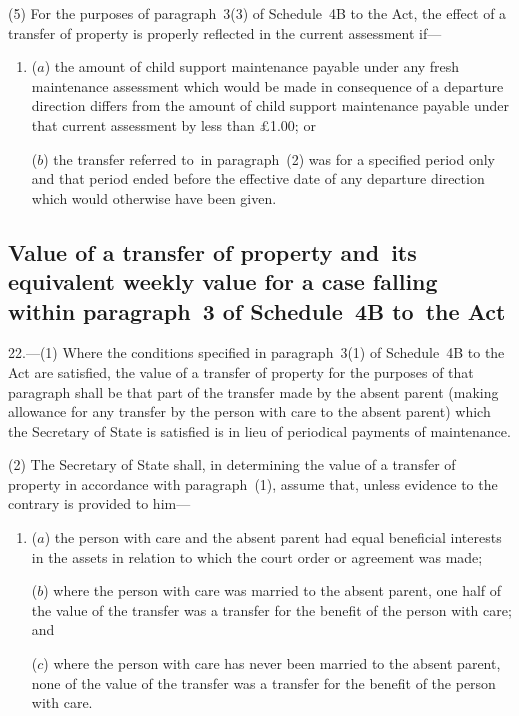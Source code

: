 \documentclass[12pt,a4paper]{article}
\begin{document}
(5) For the purposes of paragraph~3(3) of Schedule~4B to the Act, the effect of
a transfer of property is properly reflected in the current assessment if—
\begin{enumerate}\item[]
($a$) the amount of child support maintenance payable under any fresh maintenance
assessment which would be made in consequence of a departure direction differs
from the amount of child support maintenance payable under that current
assessment by less than £1$.$00; or

($b$) the transfer referred to~in paragraph~(2) was for a specified period only and
that period ended before the effective date of any departure direction which
would otherwise have been given.
\end{enumerate}

\subsection[22. Value of a transfer of property and~its equivalent weekly value for a case
falling within paragraph~3 of Schedule~4B to~the Act]{Value of a transfer of property and~its equivalent weekly value for a case
falling within paragraph~3 of Schedule~4B to~the Act}

22.—(1) Where the conditions specified in paragraph~3(1) of Schedule~4B to the Act are satisfied, the value of a transfer of property for the purposes of that paragraph shall be that part of the transfer made by the absent parent (making allowance for any transfer by the person with care to the absent parent) which the Secretary of State is satisfied is in lieu of 
periodical payments of  %
maintenance.%

(2) The Secretary of State shall, in determining the value of a transfer of
property in accordance with paragraph~(1), assume that, unless evidence to the
contrary is provided to him—
\begin{enumerate}\item[]
($a$) the person with care and the absent parent had equal beneficial interests in
the assets in relation to which the court order or agreement was made;

($b$) where the person with care was married to the absent parent, one half of the
value of the transfer was a transfer for the benefit of the person with care;
and

($c$) where the person with care has never been married to the absent parent, none
of the value of the transfer was a transfer for the benefit of the person with
care.
\end{enumerate}
\end{document}
